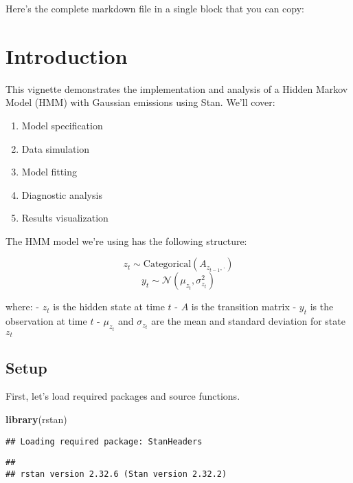 \documentclass[
]{article}
\newenvironment{Shaded}{\begin{snugshade}}{\end{snugshade}}
\newcommand{\FunctionTok}[1]{\textcolor[rgb]{0.13,0.29,0.53}{\textbf{#1}}}
\newcommand{\NormalTok}[1]{#1}
\providecommand{\tightlist}{%
  \setlength{\itemsep}{0pt}\setlength{\parskip}{0pt}}
\begin{document}
Here's the complete markdown file in a single block that you can copy:

\section{Introduction}\label{introduction}

This vignette demonstrates the implementation and analysis of a Hidden
Markov Model (HMM) with Gaussian emissions using Stan. We'll cover:

\begin{enumerate}
\def\labelenumi{\arabic{enumi}.}
\tightlist
\item
  Model specification
\item
  Data simulation
\item
  Model fitting
\item
  Diagnostic analysis
\item
  Results visualization
\end{enumerate}

The HMM model we're using has the following structure:

\[
z_t \sim \text{Categorical}(A_{z_{t-1},\cdot})
\] \[
y_t \sim \mathcal{N}(\mu_{z_t}, \sigma_{z_t}^2)
\]

where: - \(z_t\) is the hidden state at time \(t\) - \(A\) is the
transition matrix - \(y_t\) is the observation at time \(t\) -
\(\mu_{z_t}\) and \(\sigma_{z_t}\) are the mean and standard deviation
for state \(z_t\)

\subsection{Setup}\label{setup}

First, let's load required packages and source functions.

\begin{Shaded}
\begin{Highlighting}[]
\FunctionTok{library}\NormalTok{(rstan)}
\end{Highlighting}
\end{Shaded}

\begin{verbatim}
## Loading required package: StanHeaders
\end{verbatim}

\begin{verbatim}
## 
## rstan version 2.32.6 (Stan version 2.32.2)
\end{verbatim}
\end{document}
